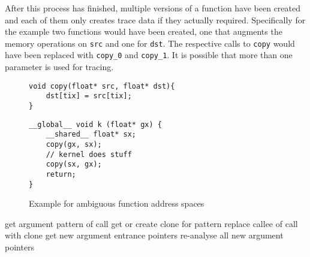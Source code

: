 After this process has finished, multiple versions of a function have been created and each of them only creates trace data if they actually required. Specifically for the example two functions would have been created, one that augments the memory operations on \verb|src| and one for \verb|dst|. The respective calls to \verb|copy| would have been replaced with \verb|copy_0| and \verb|copy_1|. It is possible that more than one parameter is used for tracing.

\begin{figure}[t]
	\begin{minipage}{0.45\textwidth}
		
		\begin{lstlisting}[style=c]
void copy(float* src, float* dst){
	dst[tix] = src[tix];
}\end{lstlisting}
	\end{minipage}\hfill
	\begin{minipage}{0.45\textwidth}
			\begin{lstlisting}[style=c]
__global__ void k (float* gx) {
	__shared__ float* sx;
	copy(gx, sx);
	// kernel does stuff
	copy(sx, gx);
	return;
}\end{lstlisting}
	\end{minipage}\hfill
\begin{minipage}{\textwidth}
	
\end{minipage}\vfill
	\caption{Example for ambiguous function address spaces}
	\label{func-vers}
\end{figure}
\begin{algorithm}[t]
	 {
		get argument pattern of call\;
		get or create clone for pattern\;
		replace callee of call with clone\;
		get new argument entrance pointers\;
	}
	 {
		re-analyse all new argument pointers\;
	}
	\caption{Algorithm for function specialization}
	\label{anal-algo}
\end{algorithm}
